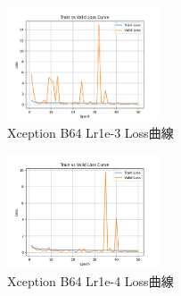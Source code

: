 \begin{abstract}
    \noindent\textbf{F. Xception}
    \\Learning rate觀察：

    當batch size = 64，且learning rate為1e-3(圖\ref{fig:Xception_P1})、1e-4(圖\ref{fig:Xception_P2})時，valid loss會產生大幅波動，波動的頻率隨著learning rate的降低而趨緩；
    而valid loss在learning rate為2e-5(圖\ref{fig:Xception_P3})時，valid loss曲線恢復正常收斂。

    對於本資料集，較大的learning rate(1e-3、1e-4)可能導致模型參數修正過於劇烈，造成accuracy與loss曲線劇烈波動，
    而較小的learning rate(2e-5)有著最穩定accuracy與loss曲線。
    \\Batch size觀察：

    當learning rate = 2e-5，且batch size為8(圖\ref{fig:Xception_P4})、32(圖\ref{fig:Xception_P5})時，valid loss會產生大幅波動，波動頻率隨著batch size的上升而趨緩；
    當batch size為64(圖\ref{fig:Xception_P3})時，valid loss曲線恢復正常收斂。

    對於本資料集，較小的batch size(8、32)可能導致模型參數修正過於劇烈，造成accuracy與loss曲線的劇烈波動，
    而較大的batch size(64)有著最穩定accuracy與loss曲線。
    \\模型總結：

    較小的Learning rate與較大的Batch size更適合本資料集，可以得到更加穩定的訓練過程。
\end{abstract}
%
\begin{figure}[H]
    \centering
    \includegraphics[width=0.40\textwidth]{./img/Xception/P1.png}
    \caption{Xception B64 Lr1e-3 Loss曲線}
    \label{fig:Xception_P1}
\end{figure}
\begin{figure}[H]
    \centering
    \includegraphics[width=0.40\textwidth]{./img/Xception/P2.png}
    \caption{Xception B64 Lr1e-4 Loss曲線}
    \label{fig:Xception_P2}
\end{figure}
